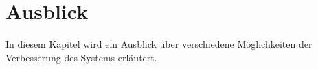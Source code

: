 \chapter{Ausblick}\label{ch:outlook}

In diesem Kapitel wird ein Ausblick über verschiedene Möglichkeiten der Verbesserung des Systems erläutert.

